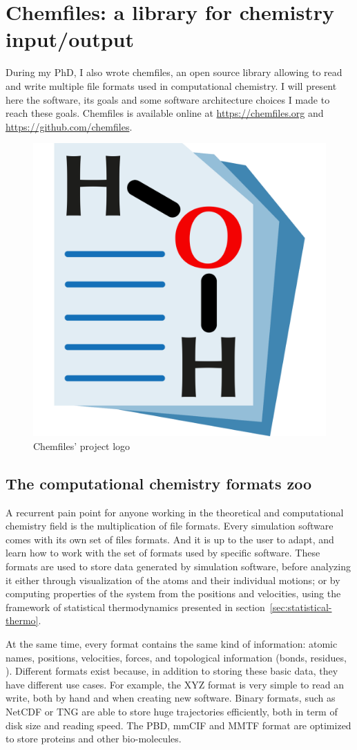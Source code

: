 \documentclass[thesis]{subfiles}
\begin{document}
\OnlyInSubfile{\appendix}
\chapter{Chemfiles: a library for chemistry input/output}
\label{sec:chemfiles}

During my PhD, I also wrote chemfiles, an open source library allowing to read
and write multiple file formats used in computational chemistry. I will present
here the software, its goals and some software architecture choices I made to
reach these goals. Chemfiles is available online at \url{https://chemfiles.org}
and \url{https://github.com/chemfiles}.

\vfill
\begin{figure}[H]
    \centering
    \includegraphics[width=.3\textwidth]{figures/images/chemfiles-logo}
    \caption{Chemfiles' project logo}
    \label{fig:chemfiles:logo}
\end{figure}
\vfill

\newpage
\section{The computational chemistry formats zoo}

A recurrent pain point for anyone working in the theoretical and computational
chemistry field is the multiplication of file formats. Every simulation software
comes with its own set of files formats. And it is up to the user to adapt, and
learn how to work with the set of formats used by specific software. These
formats are used to store data generated by simulation software, before
analyzing it either through visualization of the atoms and their individual
motions; or by computing properties of the system from the positions and
velocities, using the framework of statistical thermodynamics presented in
section~\ref{sec:statistical-thermo}.

At the same time, every format contains the same kind of information: atomic
names, positions, velocities, forces, and topological information (bonds,
residues, \etc). Different formats exist because, in addition to storing these
basic data, they have different use cases. For example, the XYZ format is very
simple to read an write, both by hand and when creating new software. Binary
formats, such as NetCDF or TNG are able to store huge trajectories efficiently,
both in term of disk size and reading speed. The PBD, mmCIF and MMTF format are
optimized to store proteins and other bio-molecules.
\end{document}
